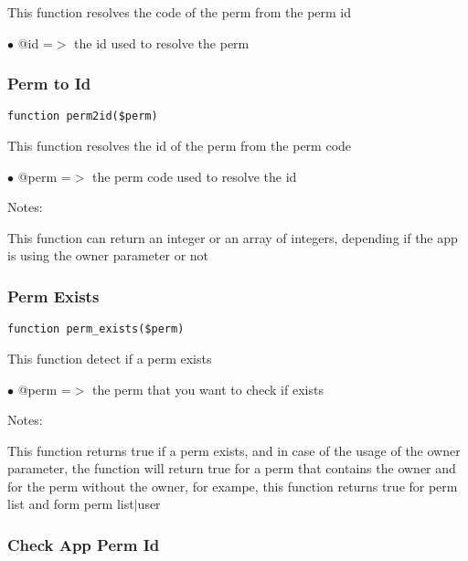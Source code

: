 \documentclass[a4paper]{article}
\begin{document}
This function resolves the code of the perm from the perm id

\begin{compactitem}
\item[\color{myblue}$\bullet$] @id =$>$ the id used to resolve the perm
\end{compactitem}

\hypertarget{toc194}{}
\subsubsection{Perm to Id}

\begin{lstlisting}
function perm2id($perm)
\end{lstlisting}

This function resolves the id of the perm from the perm code

\begin{compactitem}
\item[\color{myblue}$\bullet$] @perm =$>$ the perm code used to resolve the id
\end{compactitem}

Notes:

This function can return an integer or an array of integers, depending
if the app is using the owner parameter or not

\hypertarget{toc195}{}
\subsubsection{Perm Exists}

\begin{lstlisting}
function perm_exists($perm)
\end{lstlisting}

This function detect if a perm exists

\begin{compactitem}
\item[\color{myblue}$\bullet$] @perm =$>$ the perm that you want to check if exists
\end{compactitem}

Notes:

This function returns true if a perm exists, and in case of the usage
of the owner parameter, the function will return true for a perm that
contains the owner and for the perm without the owner, for exampe, this
function returns true for perm list and form perm list$|$user

\hypertarget{toc196}{}
\subsubsection{Check App Perm Id}
\end{document}
